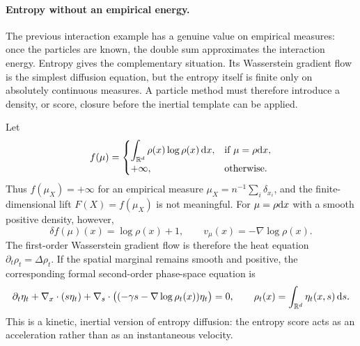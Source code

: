 \paragraph{Entropy without an empirical energy.}
The previous interaction example has a genuine value on empirical measures: once the particles are known, the double sum approximates the interaction energy. Entropy gives the complementary situation. Its Wasserstein gradient flow is the simplest diffusion equation, but the entropy itself is finite only on absolutely continuous measures. A particle method must therefore introduce a density, or score, closure before the inertial template can be applied.

\begin{example}\label{ex-second-order-entropy-score}
	Let
	\[
		f(\mu)=
		\begin{cases}
			\displaystyle \int_{\mathbb{R}^d} \rho(x)\log\rho(x)\,\mathrm{d} x,
			& \text{if } \mu=\rho\mathrm{d} x,\\[.4em]
			+\infty, & \text{otherwise.}
		\end{cases}
	\]
	Thus $f(\mu_X)=+\infty$ for an empirical measure $\mu_X=n^{-1}\sum_i\delta_{x_i}$, and the finite-dimensional lift $F(X)=f(\mu_X)$ is not meaningful. For $\mu=\rho\mathrm{d} x$ with a smooth positive density, however,
	\[
		\delta f(\mu)(x)=\log\rho(x)+1,
			\qquad
		v_\mu(x)=-\nabla\log\rho(x).
	\]
	The first-order Wasserstein gradient flow is therefore the heat equation $\partial_t\rho_t=\Delta\rho_t$. If the spatial marginal remains smooth and positive, the corresponding formal second-order phase-space equation is
	\begin{equation}\label{eq-second-order-entropy-phase-space}
		\partial_t\eta_t
		+
		\nabla_x\cdot(s\eta_t)
		+
		\nabla_s\cdot\bigl((-\gamma s-\nabla\log\rho_t(x))\eta_t\bigr)
		=0,
		\qquad
		\rho_t(x)=\int_{\mathbb{R}^d}\eta_t(x,s)\,\mathrm{d} s .
	\end{equation}
	This is a kinetic, inertial version of entropy diffusion: the entropy score acts as an acceleration rather than as an instantaneous velocity.
	\end{example}

